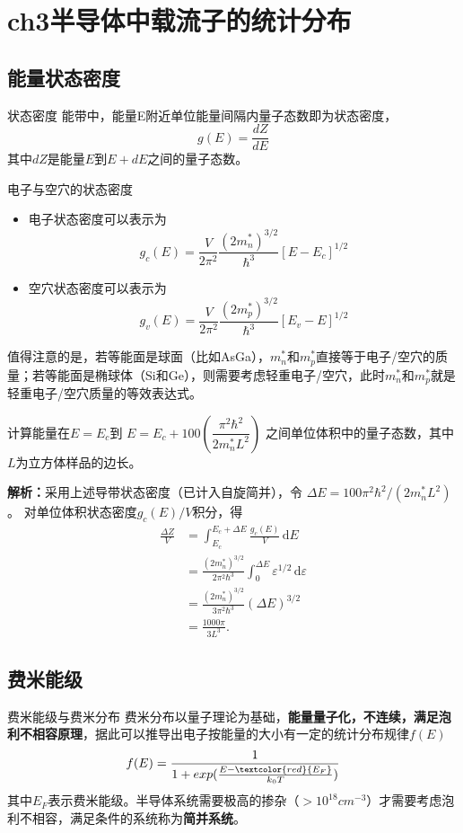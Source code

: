 \chapter{ch3半导体中载流子的统计分布}
\section{能量状态密度}
\begin{definition}{状态密度}
    能带中，能量E附近单位能量间隔内量子态数即为状态密度，
    \[
    g(E) = \frac{dZ}{dE}
    \]
    其中$dZ$是能量$E$到$E+dE$之间的量子态数。
\end{definition}

\begin{theorem}{电子与空穴的状态密度}
    \begin{itemize}
        \item 电子状态密度可以表示为 \[g_c(E)=\frac{V}{2\pi^2}\frac{(2m_{n}^{*})^{3/2}}{\hbar^3}[E-E_c]^{1/2}\]
        \item 空穴状态密度可以表示为 \[g_v(E)=\frac{V}{2\pi^2}\frac{(2m_{p}^{*})^{3/2}}{\hbar^3}[E_v-E]^{1/2}\]
    \end{itemize}
    值得注意的是，若等能面是球面（比如AsGa），$m_{n}^{*}$和$m_{p}^{*}$直接等于电子/空穴的质量；若等能面是椭球体（Si和Ge），则需要考虑轻重电子/空穴，此时$m_{n}^{*}$和$m_{p}^{*}$就是轻重电子/空穴质量的等效表达式。
    
\end{theorem}


\begin{problem}
    计算能量在$E=E_c$到
    $E=E_c+100\left(\dfrac{\pi^2\hbar^2}{2m_n^*L^2}\right)$
    之间单位体积中的量子态数，其中$L$为立方体样品的边长。

    \textbf{解析：}采用上述导带状态密度（已计入自旋简并），令
    $\Delta E=100\pi^2\hbar^2/(2m_n^*L^2)$。
    对单位体积状态密度$g_c(E)/V$积分，得
    \begin{align*}
        \frac{\Delta Z}{V}
        &=\int_{E_c}^{E_c+\Delta E}\frac{g_c(E)}{V}\,\mathrm{d}E\\
        &=\frac{(2m_n^*)^{3/2}}{2\pi^2\hbar^3}
        \int_0^{\Delta E}\varepsilon^{1/2}\,\mathrm{d}\varepsilon\\
        &=\frac{(2m_n^*)^{3/2}}{3\pi^2\hbar^3}(\Delta E)^{3/2}\\
        &=\boxed{\frac{1000\pi}{3L^3}}.
    \end{align*}
\end{problem}

\section{费米能级}
\begin{definition}{费米能级与费米分布}
    费米分布以量子理论为基础，\textbf{能量量子化，不连续，满足泡利不相容原理}，据此可以推导出电子按能量的大小有一定的统计分布规律$f(E)$
    \[
    f(E) = \frac{1}{1+exp(\frac{E-\textcolor{red}{E_F}}{k_0 T})}
    \]
    其中$E_F$表示费米能级。半导体系统需要极高的掺杂（$>10^18cm^{-3}$）才需要考虑泡利不相容，满足条件的系统称为\textbf{简并系统}。
\end{definition}

